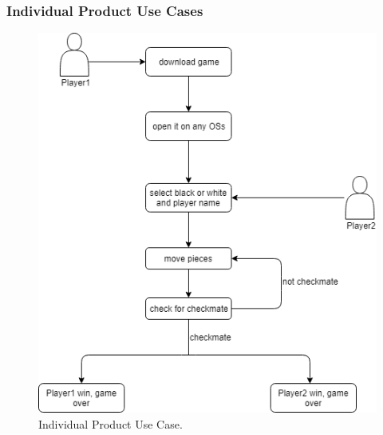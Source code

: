 \documentclass[12pt, titlepage]{article}
\begin{document}
\subsubsection{Individual Product Use Cases}
\begin{figure}[H]
  \includegraphics[width=\linewidth]{UseCase.png}
  \caption{Individual Product Use Case.}
  \label{fig:useCase}
\end{figure}
\end{document}
